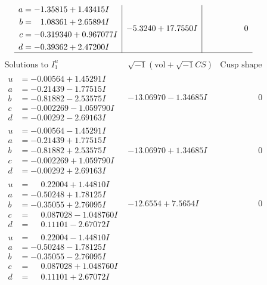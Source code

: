 \documentclass[1p]{elsarticle_modified}
\theoremstyle{definition}
\newcommand{\I}{\sqrt{-1}}
\begin{document}
$$\begin{array}{c|c|c}
\begin{aligned}
a &= -1.35815 + 1.43415 I \\
b &= \phantom{-}1.08361 + 2.65894 I \\
c &= -0.319340 + 0.967077 I \\
d &= -0.39362 + 2.47200 I\end{aligned}
 & -5.3240 + 17.7550 I & \phantom{-0.000000 } 0\\
 \hline 
 \end{array}$$\newpage$$\begin{array}{c|c|c}  
\text{Solutions to }I^u_{1}& \I (\text{vol} + \sqrt{-1}CS) & \text{Cusp shape}\\
 \hline 
\begin{aligned}
u &= -0.00564 + 1.45291 I \\
a &= -0.21439 - 1.77515 I \\
b &= -0.81882 - 2.53575 I \\
c &= -0.002269 - 1.059790 I \\
d &= -0.00292 - 2.69163 I\end{aligned}
 & -13.06970 - 1.34685 I & \phantom{-0.000000 } 0 \\ \hline\begin{aligned}
u &= -0.00564 - 1.45291 I \\
a &= -0.21439 + 1.77515 I \\
b &= -0.81882 + 2.53575 I \\
c &= -0.002269 + 1.059790 I \\
d &= -0.00292 + 2.69163 I\end{aligned}
 & -13.06970 + 1.34685 I & \phantom{-0.000000 } 0 \\ \hline\begin{aligned}
u &= \phantom{-}0.22004 + 1.44810 I \\
a &= -0.50248 + 1.78125 I \\
b &= -0.35055 + 2.76095 I \\
c &= \phantom{-}0.087028 - 1.048760 I \\
d &= \phantom{-}0.11101 - 2.67072 I\end{aligned}
 & -12.6554 + 7.5654 I & \phantom{-0.000000 } 0 \\ \hline\begin{aligned}
u &= \phantom{-}0.22004 - 1.44810 I \\
a &= -0.50248 - 1.78125 I \\
b &= -0.35055 - 2.76095 I \\
c &= \phantom{-}0.087028 + 1.048760 I \\
d &= \phantom{-}0.11101 + 2.67072 I\end{aligned}

\end{array}$$
\end{document}
